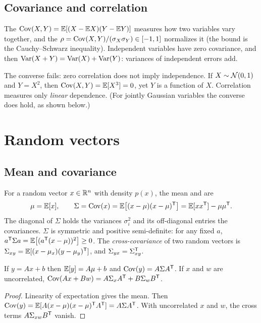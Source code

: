 \subsection{Covariance and correlation}

The  $\operatorname{Cov}(X, Y) = \mathbb{E}[(X - \mathbb{E} X)(Y - \mathbb{E} Y)]$ measures how two variables vary together, and the  $\rho = \operatorname{Cov}(X, Y)/(\sigma_X\sigma_Y) \in [-1, 1]$ normalizes it (the bound is the Cauchy--Schwarz inequality). Independent
variables have zero covariance, and then $\operatorname{Var}(X + Y) = \operatorname{Var}(X) + \operatorname{Var}(Y)$: variances of independent errors add.

The converse fails: zero correlation does not imply independence. If $X \sim \mathcal{N}(0, 1)$ and $Y = X^2$, then $\operatorname{Cov}(X, Y) = \mathbb{E}[X^3] = 0$, yet $Y$
is a function of $X$. Correlation measures only \emph{linear} dependence. (For jointly Gaussian variables the converse does hold, as shown
below.)

\section{Random vectors}

\subsection{Mean and covariance}

For a random vector $x \in \mathbb{R}^n$ with density $p(x)$, the mean and  are
\begin{equation}
  \mu = \mathbb{E}[x], \qquad \Sigma = \operatorname{Cov}(x) = \mathbb{E}\big[(x - \mu)(x - \mu)^{\mathsf{T}}\big] = \mathbb{E}[xx^{\mathsf{T}}] - \mu\mu^{\mathsf{T}} .
\end{equation}
The diagonal of $\Sigma$ holds the variances $\sigma_i^2$ and its off-diagonal entries the covariances. $\Sigma$ is symmetric and positive
semi-definite: for any fixed $a$, $a^{\mathsf{T}}\Sigma a = \mathbb{E}\big[(a^{\mathsf{T}}(x - \mu))^2\big] \ge 0$. The \emph{cross-covariance} of two random vectors is
$\Sigma_{xy} = \mathbb{E}[(x - \mu_x)(y - \mu_y)^{\mathsf{T}}]$, and $\Sigma_{yx} = \Sigma_{xy}^{\mathsf{T}}$.

\begin{proposition}
\label{prop:affine}
If $y = Ax + b$ then $\mathbb{E}[y] = A\mu + b$ and $\operatorname{Cov}(y) = A\Sigma A^{\mathsf{T}}$. If $x$ and $w$ are uncorrelated, $\operatorname{Cov}(Ax + Bw) = A\Sigma_xA^{\mathsf{T}} + B\Sigma_wB^{\mathsf{T}}$.
\end{proposition}
\begin{proof}
Linearity of expectation gives the mean. Then $\operatorname{Cov}(y) = \mathbb{E}[A(x - \mu)(x - \mu)^{\mathsf{T}} A^{\mathsf{T}}] = A\Sigma A^{\mathsf{T}}$. With uncorrelated $x$ and $w$, the cross terms
$A\Sigma_{xw}B^{\mathsf{T}}$ vanish.
\end{proof}

